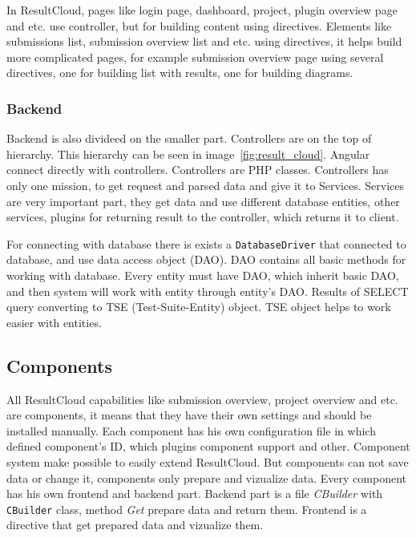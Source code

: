 In ResultCloud, pages like login page, dashboard, project, plugin overview page and etc. use controller, but for building content using directives. Elements like submissions list, submission overview list and etc. using directives, it helps build more complicated pages, for example submission overview page using several directives, one for building list with results, one for building diagrams. 

\subsubsection{Backend}

Backend is also divideed on the smaller part. Controllers are on the top of hierarchy. This hierarchy can be seen in image\ \ref{fig:result_cloud}. Angular connect directly with controllers. Controllers are PHP classes. Controllers has only one mission, to get request and parsed data and give it to Services. Services are very important part, they get data and use different database entities, other services, plugins for returning result to the controller, which returns it to client.

For connecting with database there is exists a \texttt{DatabaseDriver} that connected to database, and use data access object (DAO). DAO contains all basic methods for working with database. Every entity must have DAO, which inherit basic DAO, and then system will work with entity through entity's DAO. Results of SELECT query converting to TSE (Test-Suite-Entity) object. TSE object helps to work easier with entities.


\subsection{Components}

All ResultCloud capabilities like submission overview, project overview and etc. are components, it means that they have their own settings and should be installed manually. Each component has his own configuration file in which defined component's ID, which plugins component support and other. Component system make possible to easily extend ResultCloud. But components can not save data or change it, components only prepare and vizualize data. Every component has his own frontend and backend part. Backend part is a file \emph{CBuilder} with \texttt{CBuilder} class, method \emph{Get} prepare data and return them. Frontend is a directive that get prepared data and vizualize them.   

